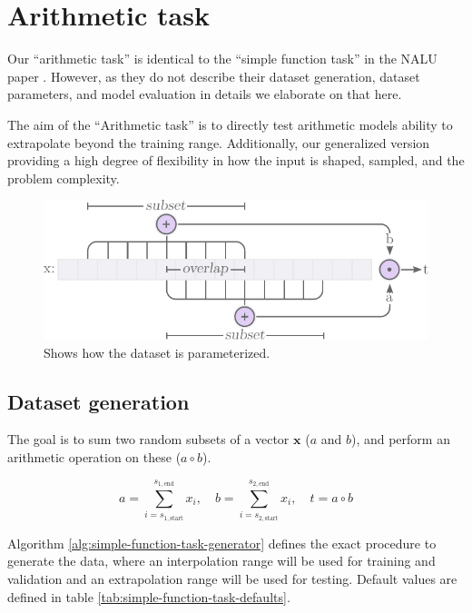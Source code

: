 \section{Arithmetic task}

Our ``arithmetic task'' is identical to the ``simple function task'' in the NALU paper \cite{trask-nalu}. However, as they do not describe their dataset generation, dataset parameters, and model evaluation in details we elaborate on that here.

The aim of the ``Arithmetic task'' is to directly test arithmetic models ability to extrapolate beyond the training range. Additionally, our generalized version providing a high degree of flexibility in how the input is shaped, sampled, and the problem complexity.

\begin{figure}[h]
\centering
\includegraphics[scale=0.7]{graphics/function_task_static_problem.pdf}
\caption{Shows how the dataset is parameterized.}
\label{fig:simple-function-task-problem}
\end{figure}

\subsection{Dataset generation}
\label{sec:appendix:simple-function-task:data-generation}

The goal is to sum two random subsets of a vector $\mathbf{x}$ ($a$ and $b$), and perform an arithmetic operation on these ($a \circ b$).

\begin{equation}
    a = \sum_{i=s_{1,\mathrm{start}}}^{s_{1,\mathrm{end}}} x_i, \quad b = \sum_{i=s_{2,\mathrm{start}}}^{s_{2,\mathrm{end}}} x_i, \quad t = a \circ b
\end{equation}

Algorithm \ref{alg:simple-function-task-generator} defines the exact procedure to generate the data, where an interpolation range will be used for training and validation and an extrapolation range will be used for testing. Default values are defined in table \ref{tab:simple-function-task-defaults}.

